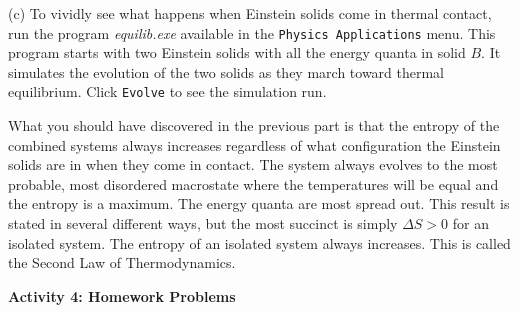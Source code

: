 (c) To  vividly see what happens when Einstein solids come in thermal contact,
run the program {\it equilib.exe} available in the {\tt Physics Applications} menu.
This program starts with two Einstein solids with all the energy quanta in solid $B$.
It simulates the evolution of the two solids as they march toward
thermal equilibrium.
Click {\tt Evolve} to see the simulation run.

What you should have discovered in the previous part is that the entropy of the combined systems
always increases regardless of what configuration the Einstein solids are in when they
come in contact.
The system always evolves to the most probable, most disordered
 macrostate where the temperatures will
be equal and the entropy is a maximum.
The energy quanta are most spread out.
This result is stated in several different ways, but the most succinct is simply
$\Delta S > 0$ for an isolated system.
The entropy of an isolated system always increases.
This is called the Second Law of Thermodynamics.

\bigskip

\textbf{Activity 4: Homework Problems}

